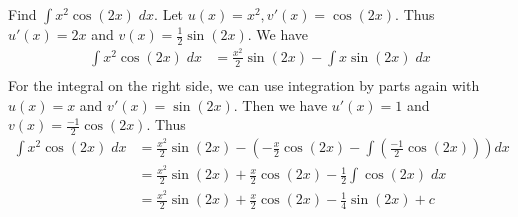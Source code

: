 \documentclass{article}
\begin{document}
  \begin{example}
    Find $\int x^2 \cos(2x) \; dx$. Let $u(x) = x^2, v'(x) = \cos(2x)$. Thus $u'(x) = 2x$ and $v(x) = \frac{1}{2}\sin(2x)$. We have
    \begin{align*}
      \int x^2\cos(2x) \; dx &= \frac{x^2}{2}\sin(2x) - \int x \sin(2x) \; dx\\
    \end{align*}
    For the integral on the right side, we can use integration by parts again with $u(x) = x$ and $v'(x) = \sin(2x)$. Then we have $u'(x) = 1$ and $v(x) = \frac{-1}{2}\cos(2x)$. Thus
    \begin{align*}
      \int x^2\cos(2x) \; dx &= \frac{x^2}{2}\sin(2x) - \left(- \frac{x}{2}\cos (2x) - \int\left(\frac{-1}{2} \cos (2x)\right)\right) dx\\
      &= \frac{x^2}{2}\sin(2x) + \frac{x}{2}\cos(2x) - \frac{1}{2}\int \cos (2x) \; dx\\
      &= \frac{x^2}{2}\sin(2x) + \frac{x}{2}\cos(2x) - \frac{1}{4} \sin (2x) + c\\
    \end{align*}
  \end{example}
\end{document}
